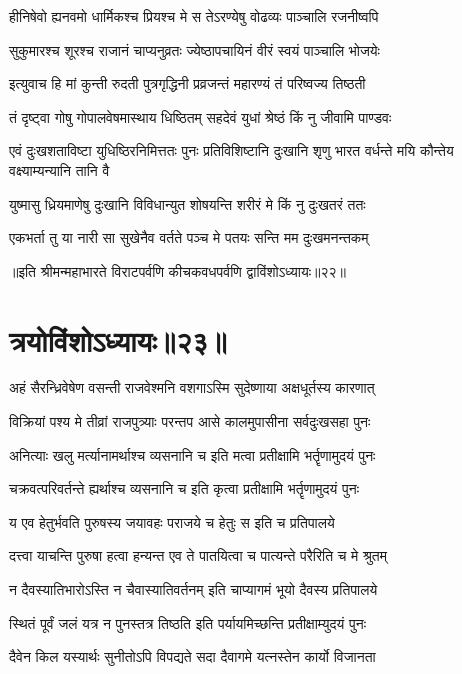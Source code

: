 \twolineshloka
{हीनिषेवो ह्यनवमो धार्मिकश्च प्रियश्च मे}
{स तेऽरण्येषु वोढव्यः पाञ्चालि रजनीष्वपि}


\twolineshloka
{सुकुमारश्च शूरश्च राजानं चाप्यनुव्रतः}
{ज्येष्ठापचायिनं वीरं स्वयं पाञ्चालि भोजयेः}


\twolineshloka
{इत्युवाच हि मां कुन्ती रुदती पुत्रगृद्धिनी}
{प्रव्रजन्तं महारण्यं तं परिष्वज्य तिष्ठती}


\twolineshloka
{तं दृष्ट्वा गोषु गोपालवेषमास्थाय धिष्ठितम्}
{सहदेवं युधां श्रेष्ठं किं नु जीवामि पाण्डवः}


\onelineshloka
{एवं दुःखशताविष्टा युधिष्ठिरनिमित्ततः}
\twolineshloka
{पुनः प्रतिविशिष्टानि दुःखानि शृणु भारत}
{वर्धन्ते मयि कौन्तेय वक्ष्याम्यन्यानि तानि वै}


\twolineshloka
{युष्मासु ध्रियमाणेषु दुःखानि विविधान्युत}
{शोषयन्ति शरीरं मे किं नु दुःखतरं ततः}


\twolineshloka
{एकभर्ता तु या नारी सा सुखेनैव वर्तते}
{पञ्च मे पतयः सन्ति मम दुःखमनन्तकम्}

॥इति श्रीमन्महाभारते विराटपर्वणि कीचकवधपर्वणि द्वाविंशोऽध्यायः॥२२॥

\chapter{त्रयोविंशोऽध्यायः॥२३॥}


\twolineshloka
{अहं सैरन्ध्रिवेषेण वसन्ती राजवेश्मनि}
{वशगाऽस्मि सुदेष्णाया अक्षधूर्तस्य कारणात्}


\twolineshloka
{विक्रियां पश्य मे तीव्रां राजपुत्र्याः परन्तप}
{आसे कालमुपासीना सर्वदुःखसहा पुनः}


\twolineshloka
{अनित्याः खलु मर्त्यानामर्थाश्च व्यसनानि च}
{इति मत्वा प्रतीक्षामि भर्तॄणामुदयं पुनः}


\twolineshloka
{चक्रवत्परिवर्तन्ते ह्यर्थाश्च व्यसनानि च}
{इति कृत्वा प्रतीक्षामि भर्तॄणामुदयं पुनः}


\twolineshloka
{य एव हेतुर्भवति पुरुषस्य जयावहः}
{पराजये च हेतुः स इति च प्रतिपालये}


\twolineshloka
{दत्त्वा याचन्ति पुरुषा हत्वा हन्यन्त एव ते}
{पातयित्वा च पात्यन्ते परैरिति च मे श्रुतम्}


\twolineshloka
{न दैवस्यातिभारोऽस्ति न चैवास्यातिवर्तनम्}
{इति चाप्यागमं भूयो दैवस्य प्रतिपालये}


\twolineshloka
{स्थितं पूर्वं जलं यत्र न पुनस्तत्र तिष्ठति}
{इति पर्यायमिच्छन्ति प्रतीक्षाम्युदयं पुनः}


\twolineshloka
{दैवेन किल यस्यार्थः सुनीतोऽपि विपद्यते}
{सदा दैवागमे यत्नस्तेन कार्यो विजानता}


